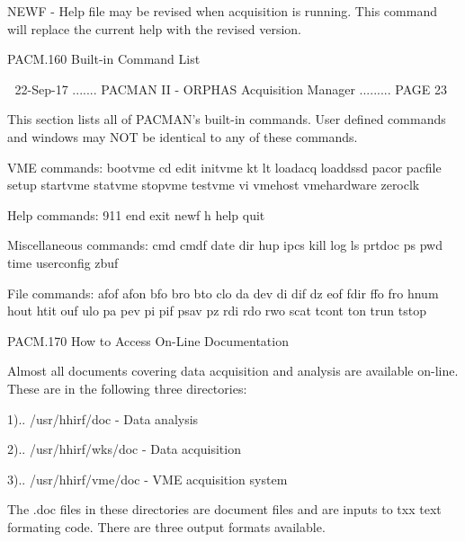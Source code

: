    NEWF - Help file may be revised when acquisition is running.  This
          command will replace the current help with the revised version.
 
 
   PACM.160 Built-in Command List
 
    
   22-Sep-17 ....... PACMAN II - ORPHAS Acquisition Manager ......... PAGE  23
 
   This  section  lists  all  of  PACMAN's  built-in  commands.   User defined
   commands and windows may NOT be identical to any of these commands.
 
   VME commands:
       bootvme       cd             edit          initvme
       kt            lt             loadacq       loaddssd
       pacor         pacfile        setup         startvme
       statvme       stopvme        testvme       vi
       vmehost       vmehardware    zeroclk
 
   Help commands:
       911           end            exit          newf
       h             help           quit
 
   Miscellaneous commands:
       cmd           cmdf           date          dir
       hup           ipcs           kill          log
       ls            prtdoc         ps            pwd
       time          userconfig     zbuf
 
   File commands:
       afof          afon          bfo           bro
       bto           clo           da            dev
       di            dif           dz            eof
       fdir          ffo           fro           hnum
       hout          htit          ouf           ulo
       pa            pev           pi            pif
       psav          pz            rdi           rdo
       rwo           scat          tcont         ton
       trun          tstop
 
 
   PACM.170 How to Access On-Line Documentation
 
   Almost all documents covering data acquisition and analysis  are  available
   on-line.  These are in the following three directories:
 
          1).. /usr/hhirf/doc    -  Data analysis
 
          2).. /usr/hhirf/wks/doc - Data acquisition
 
          3).. /usr/hhirf/vme/doc - VME acquisition system
 
   The  .doc  files  in these directories are document files and are inputs to
   txx text formating code.  There are three output formats available.
 
